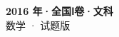 \documentclass[zihao=-4, a4paper]{ctexart}
\begin{document}
\begin{center}
  {\Large\bfseries 2016 年·全国Ⅰ卷·文科}\\[4pt]
  {\large 数学 · 试题版}
\end{center}
\medskip
{}

\end{document}
